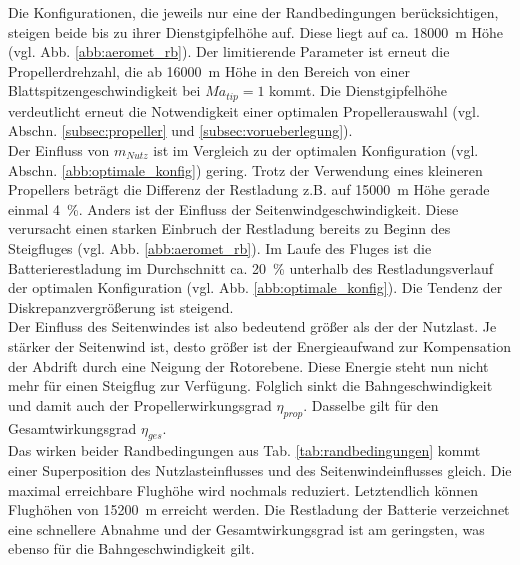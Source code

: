 Die Konfigurationen, die jeweils nur eine der Randbedingungen berücksichtigen, steigen beide bis zu ihrer Dienstgipfelhöhe auf. Diese liegt auf ca. \SI{18000}{m} Höhe (vgl. Abb. \ref{abb:aeromet_rb}). Der limitierende Parameter ist erneut die Propellerdrehzahl, die ab \SI{16000}{m} Höhe in den Bereich von einer Blattspitzengeschwindigkeit bei \ensuremath{Ma_{tip} = 1} kommt. Die Dienstgipfelhöhe verdeutlicht erneut die Notwendigkeit einer optimalen Propellerauswahl (vgl. Abschn. \ref{subsec:propeller} und \ref{subsec:vorueberlegung}). \\
Der Einfluss von \ensuremath{m_{Nutz}} ist im Vergleich zu der optimalen Konfiguration (vgl. Abschn. \ref{abb:optimale_konfig}) gering. Trotz der Verwendung eines kleineren Propellers beträgt die Differenz der Restladung z.B. auf \SI{15000}{m} Höhe gerade einmal \SI{4}{\%}. Anders ist der Einfluss der Seitenwindgeschwindigkeit. Diese verursacht einen starken Einbruch der Restladung bereits zu Beginn des Steigfluges (vgl. Abb. \ref{abb:aeromet_rb}). Im Laufe des Fluges ist die Batterierestladung im Durchschnitt ca. \SI{20}{\%} unterhalb des Restladungsverlauf der optimalen Konfiguration (vgl. Abb. \ref{abb:optimale_konfig}). Die Tendenz der Diskrepanzvergrößerung ist steigend.\\
Der Einfluss des Seitenwindes ist also bedeutend größer als der der Nutzlast. Je stärker der Seitenwind ist, desto größer ist der Energieaufwand zur Kompensation der Abdrift durch eine Neigung der Rotorebene. Diese Energie steht nun nicht mehr für einen Steigflug zur Verfügung. Folglich sinkt die Bahngeschwindigkeit und damit auch der Propellerwirkungsgrad \ensuremath{\eta_{prop}}. Dasselbe gilt für den Gesamtwirkungsgrad \ensuremath{\eta_{ges}}. \\
Das wirken beider Randbedingungen aus Tab. \ref{tab:randbedingungen} kommt einer Superposition des Nutzlasteinflusses und des Seitenwindeinflusses gleich. Die maximal erreichbare Flughöhe wird nochmals reduziert. Letztendlich können Flughöhen von \SI{15200}{m} erreicht werden. Die Restladung der Batterie verzeichnet eine schnellere Abnahme und der Gesamtwirkungsgrad ist am geringsten, was ebenso für die Bahngeschwindigkeit gilt. 

